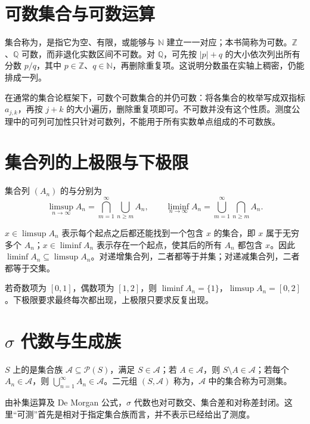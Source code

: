 \documentclass[UTF8,12pt,a4paper,fontset=fandol]{ctexbook}
\begin{document}
\section{可数集合与可数运算}
集合称为，是指它为空、有限，或能够与 $\mathbb N$ 建立一一对应；本书简称为可数。$\mathbb Z$、$\mathbb Q$ 可数，而非退化实数区间不可数。对 $\mathbb Q$，可先按 $|p|+q$ 的大小依次列出所有分数 $p/q$，其中 $p\in\mathbb Z$、$q\in\mathbb N$，再删除重复项。这说明分数虽在实轴上稠密，仍能排成一列。

在通常的集合论框架下，可数个可数集合的并仍可数：将各集合的枚举写成双指标 $a_{j,k}$，再按 $j+k$ 的大小遍历，删除重复项即可。不可数并没有这个性质。测度公理中的可列可加性只针对可数列，不能用于所有实数单点组成的不可数族。

\section{集合列的上极限与下极限}
\begin{definition}
集合列 $(A_n)$ 的与分别为
\begin{equation}
 \limsup_{n\to\infty}A_n=\bigcap_{m=1}^{\infty}\bigcup_{n\geq m}A_n,\qquad
 \liminf_{n\to\infty}A_n=\bigcup_{m=1}^{\infty}\bigcap_{n\geq m}A_n.
 \label{eq:mt-set-limits}
\end{equation}
\end{definition}
$x\in\limsup A_n$ 表示每个起点之后都还能找到一个包含 $x$ 的集合，即 $x$ 属于无穷多个 $A_n$；$x\in\liminf A_n$ 表示存在一个起点，使其后的所有 $A_n$ 都包含 $x$。因此 $\liminf A_n\subseteq\limsup A_n$。对递增集合列，二者都等于并集；对递减集合列，二者都等于交集。

\begin{example}
若奇数项为 $[0,1]$，偶数项为 $[1,2]$，则 $\liminf A_n=\{1\}$，$\limsup A_n=[0,2]$。下极限要求最终每次都出现，上极限只要求反复出现。
\end{example}

\section{$\sigma$ 代数与生成族}
\begin{definition}
$S$ 上的是集合族 $\mathcal A\subseteq\mathcal P(S)$，满足 $S\in\mathcal A$；若 $A\in\mathcal A$，则 $S\setminus A\in\mathcal A$；若每个 $A_n\in\mathcal A$，则 $\bigcup_{n=1}^{\infty}A_n\in\mathcal A$。二元组 $(S,\mathcal A)$ 称为，$\mathcal A$ 中的集合称为可测集。
\end{definition}
由补集运算及 De Morgan 公式，$\sigma$ 代数也对可数交、集合差和对称差封闭。这里“可测”首先是相对于指定集合族而言，并不表示已经给出了测度。
\end{document}
